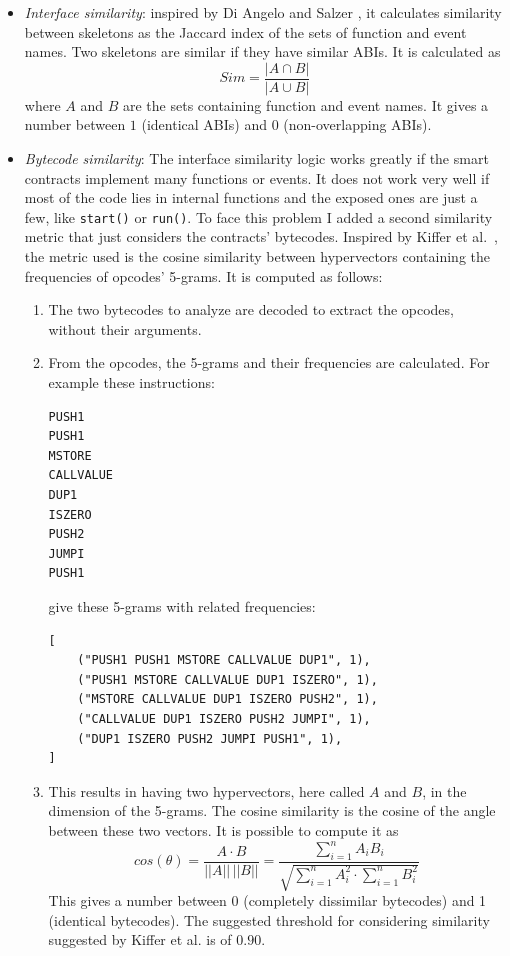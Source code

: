 \begin{itemize}
    \item \textit{Interface similarity}: inspired by Di Angelo and Salzer \cite{clustering-sc}, it calculates similarity between skeletons as the Jaccard index of the sets of function and event names. Two skeletons are similar if they have similar ABIs. It is calculated as 
    \begin{equation}
	Sim = \frac{|A\cap B|}{|A\cup B|}
    \end{equation}
    where $A$ and $B$ are the sets containing function and event names. It gives a number between $1$ (identical ABIs) and $0$ (non-overlapping ABIs).
    
    \item \textit{Bytecode similarity}: The interface similarity logic works greatly if the smart contracts implement many functions or events. It does not work very well if most of the code lies in internal functions and the exposed ones are just a few, like \texttt{start()} or \texttt{run()}. 
    To face this problem I added a second similarity metric that just considers the contracts' bytecodes. Inspired by Kiffer et al.~\cite{ethereum-sc-topology}, the metric used is the cosine similarity between hypervectors containing the frequencies of opcodes' 5-grams. It is computed as follows:
    \begin{enumerate}
        \item The two bytecodes to analyze are decoded to extract the opcodes, without their arguments.
        \item From the opcodes, the 5-grams and their frequencies are calculated. For example these instructions: 
        \begin{lstlisting}
PUSH1
PUSH1
MSTORE
CALLVALUE
DUP1
ISZERO
PUSH2
JUMPI
PUSH1\end{lstlisting}
        give these 5-grams with related frequencies:
        \begin{lstlisting}
[
    ("PUSH1 PUSH1 MSTORE CALLVALUE DUP1", 1),
    ("PUSH1 MSTORE CALLVALUE DUP1 ISZERO", 1),
    ("MSTORE CALLVALUE DUP1 ISZERO PUSH2", 1),
    ("CALLVALUE DUP1 ISZERO PUSH2 JUMPI", 1),
    ("DUP1 ISZERO PUSH2 JUMPI PUSH1", 1),
]       \end{lstlisting}
        \item This results in having two hypervectors, here called $A$ and $B$, in the dimension of the 5-grams. The cosine similarity is the cosine of the angle between these two vectors. It is possible to compute it as 
        \[
        cos(\theta)=\frac{A \cdot B}{||A||\,||B||}=\frac{\sum\limits_{i=1}^{n}A_iB_i}{ \sqrt{\sum\limits_{i=1}^{n}A^2_i \cdot \sum\limits_{i=1}^{n}B^2_i} }
        \]
        This gives a number between 0 (completely dissimilar bytecodes) and 1 (identical bytecodes). The suggested threshold for considering similarity suggested by Kiffer et al. is of $0.90$.
    \end{enumerate}
\end{itemize}


